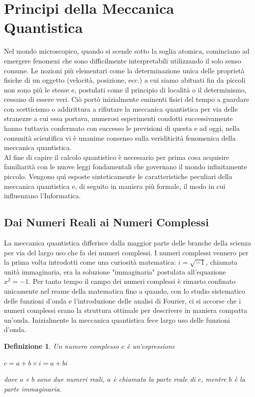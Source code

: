 \documentclass[12pt,a4paper,openright]{report}
\newtheorem{mydef}{Definizione}[chapter]
\begin{document}
\section{Principi della Meccanica Quantistica}
Nel mondo microscopico, quando si scende sotto la soglia atomica, cominciano ad emergere fenomeni che sono difficilmente interpretabili utilizzando il solo senso comune.
Le nozioni più elementari come la determinazione unica delle proprietà fisiche di un oggetto (velocità, posizione, ecc.) a cui siamo abituati fin da piccoli non sono più le stesse e,
postulati come il principio di località o il determinismo, cessano di essere veri.
Ciò portò inizialmente eminenti fisici del tempo a guardare con scetticismo o addirittura a rifiutare la meccanica quantistica per via delle stranezze a cui essa portava,
numerosi esperimenti condotti successivamente hanno tuttavia confermato con successo le previsioni di questa e ad oggi, nella comunità scientifica vi è unanime consenso sulla veriditicità fenomenica della meccanica quantistica.\\
Al fine di capire il calcolo quantistico è necessario per prima cosa acquisire familiarità con le nuove leggi fondamentali che governano il mondo infinitamente piccolo.
Vengono quì esposte sinteticamente le caratteristiche peculiari della meccanica quantistica e, di seguito in maniera più formale, il modo in cui influenzano l'Informatica.

\subsection{Dai Numeri Reali ai Numeri Complessi}
La meccanica quantistica differisce dalla maggior parte delle branche della scienza per via del largo uso che fa dei numeri complessi.
I numeri complessi vennero per la prima volta introdotti come una curiosità matematica: $i=\sqrt{-1}$, chiamata unità immaginaria, era la soluzione "immaginaria" postulata
all'equazione $x^2=-1$. Per tanto tempo il campo dei numeri complessi è rimasto confinato unicamente nel reame della matematica fino a quando,
con lo studio sistematico delle funzioni d'onda e l'introduzione delle analisi di Fourier, ci si accorse che i numeri complessi erano la struttura
ottimale per descrivere in maniera compatta un'onda. Inizialmente la meccanica quantistica fece largo uso delle funzioni d'onda.\par
\begin{mydef}
    Un numero complesso $\text{c}$ è un'espressione
    \begin{center}
        $c = a + b \times i = a + bi$\\
    \end{center}
        dove $a$ e $b$ sono due numeri reali, $a$ è chiamata la parte reale di $c$, mentre $b$ è la parte immaginaria.
    
\end{mydef}
\end{document}
